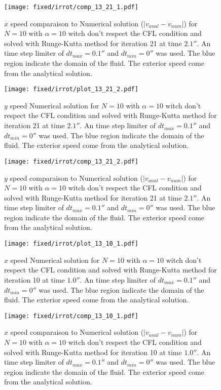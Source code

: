\begin{figure}
\texttt{[image: fixed/irrot/comp\_13\_21\_1.pdf]}
\caption{$x$ speed comparaison to Numerical solution ($|v_{anal}-v_{num}|$) for $N=10$ with $\alpha=10$ witch don't respect the CFL condition and solved with Runge-Kutta method
for iteration 21 at time $\unit{2.1}{\second}$.
An time step limiter of $dt_{max}=\unit{0.1}{\second}$ and $dt_{min}=\unit{0}{\second}$ was used.
The blue region indicate the domain of the fluid. The exterior speed come from the analytical solution.
\label{fix:comp_13_21_1}
}
\end{figure}

\begin{figure}
\texttt{[image: fixed/irrot/plot\_13\_21\_2.pdf]}
\caption{$y$ speed Numerical solution for $N=10$ with $\alpha=10$ witch don't respect the CFL condition and solved with Runge-Kutta method
for iteration 21 at time $\unit{2.1}{\second}$.
An time step limiter of $dt_{max}=\unit{0.1}{\second}$ and $dt_{min}=\unit{0}{\second}$ was used.
The blue region indicate the domain of the fluid. The exterior speed come from the analytical solution.
\label{fix:plot_13_21_2}
}
\end{figure}


\begin{figure}
\texttt{[image: fixed/irrot/comp\_13\_21\_2.pdf]}
\caption{$y$ speed comparaison to Numerical solution ($|v_{anal}-v_{num}|$) for $N=10$ with $\alpha=10$ witch don't respect the CFL condition and solved with Runge-Kutta method
for iteration 21 at time $\unit{2.1}{\second}$.
An time step limiter of $dt_{max}=\unit{0.1}{\second}$ and $dt_{min}=\unit{0}{\second}$ was used.
The blue region indicate the domain of the fluid. The exterior speed come from the analytical solution.
\label{fix:comp_13_21_2}
}
\end{figure}


\begin{figure}
\texttt{[image: fixed/irrot/plot\_13\_10\_1.pdf]}
\caption{$x$ speed Numerical solution for $N=10$ with $\alpha=10$ witch don't respect the CFL condition and solved with Runge-Kutta method
for iteration 10 at time $\unit{1.0}{\second}$.
An time step limiter of $dt_{max}=\unit{0.1}{\second}$ and $dt_{min}=\unit{0}{\second}$ was used.
The blue region indicate the domain of the fluid. The exterior speed come from the analytical solution.
\label{fix:plot_13_10_1}
}
\end{figure}

\begin{figure}
\texttt{[image: fixed/irrot/comp\_13\_10\_1.pdf]}
\caption{$x$ speed comparaison to Numerical solution ($|v_{anal}-v_{num}|$) for $N=10$ with $\alpha=10$ witch don't respect the CFL condition and solved with Runge-Kutta method
for iteration 10 at time $\unit{1.0}{\second}$.
An time step limiter of $dt_{max}=\unit{0.1}{\second}$ and $dt_{min}=\unit{0}{\second}$ was used.
The blue region indicate the domain of the fluid. The exterior speed come from the analytical solution.
\label{fix:comp_13_10_1}
}
\end{figure}

